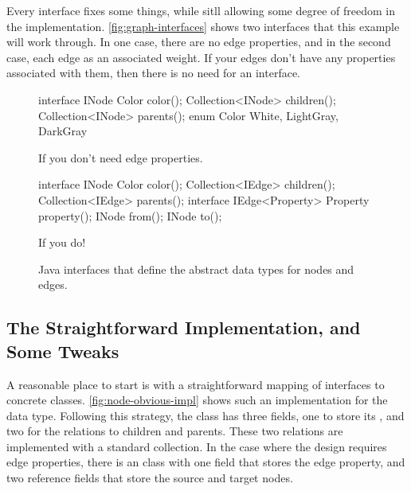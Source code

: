 Every interface fixes some things, while sitll allowing some degree of freedom
in the implementation. \autoref{fig:graph-interfaces} shows two interfaces that
this example will work through. In one case, there are no edge properties, and
in the second case, each edge as an associated weight. If your edges don't have
any properties associated with them, then there is no need for an 
interface. 

\begin{figure}
\centering
\begin{subfloat}
\label{fig:graph-interfaces}
\begin{minipage}[b]{0.45\textwidth}
\begin{framedlisting}
interface INode {
  Color color();
  Collection<INode> children();
  Collection<INode> parents();
}
enum Color {
  White, LightGray, DarkGray
}
\end{framedlisting}
\end{minipage}
\caption{If you don't need edge properties.}
\end{subfloat}
\begin{subfloat}
\label{fig:graph-interfaces}
\begin{minipage}[b]{0.45\textwidth}
\begin{framedlisting}
interface INode {
  Color color();
  Collection<IEdge> children();
  Collection<IEdge> parents();
}
interface IEdge<Property> {
   Property property();
   INode from();
   INode to();
}
\end{framedlisting}
\end{minipage}
\caption{If you do!}
\end{subfloat}
\caption{Java interfaces that define the abstract data types for nodes and
edges.}
\label{fig:graph-interfaces}
\end{figure}


\subsection{The Straightforward Implementation, and Some Tweaks}
\label{sec:graph-straightforward}
A reasonable place to start is with a straightforward mapping of interfaces to
concrete classes.
\autoref{fig:node-obvious-impl} shows such an implementation for the
 data type.
Following this strategy, the  class has three fields, one to store
its , and two for the relations to children and parents. These two
relations are implemented with a standard  collection. In the
case where the design requires edge properties, there is an  class
with one field that stores the edge property, and two reference fields that
store the source and target nodes.


